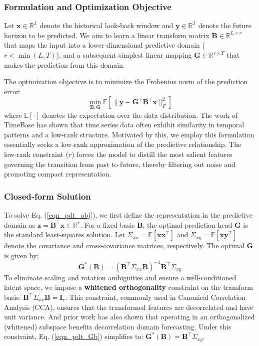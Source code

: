 \documentclass[final,3p,times]{elsarticle}
\begin{document}
\subsubsection{Formulation and Optimization Objective}

Let $\mathbf{x} \in \mathbb{R}^{L}$ denote the historical look-back window and $\mathbf{y} \in \mathbb{R}^{T}$ denote the future horizon to be predicted. We aim to learn a linear transform matrix $\mathbf{B} \in \mathbb{R}^{L\times r}$ that maps the input into a lower-dimensional predictive domain ($r < \min(L,T)$), and a subsequent simplest linear mapping $\mathbf{G} \in \mathbb{R}^{r\times T}$ that makes the prediction from this domain.

The optimization objective is to minimize the Frobenius norm of the prediction error:
\begin{equation}
\label{eqn_pdt_obj}
\min_{\mathbf{B}, \mathbf{G}} \mathbb{E} \left[ \|\mathbf{y} - \mathbf{G}^\top \mathbf{B}^\top \mathbf{x} \|_F^2 \right]
\end{equation}
where $\mathbb{E}[\cdot]$ denotes the expectation over the data distribution. The work of TimeBase\cite{huang2025timebase} has shown that time series data often exhibit similarity in temporal patterns and a low-rank structure. Motivated by this, we employ this formulation essentially seeks a low-rank approximation of the predictive relationship. The low-rank constraint ($r$) forces the model to distill the most salient features governing the transition from past to future, thereby filtering out noise and promoting compact representation.

\subsubsection{Closed-form Solution}

To solve Eq. (\ref{eqn_pdt_obj}), we first define the representation in the predictive domain as $\mathbf{z} = \mathbf{B}^\top \mathbf{x} \in \mathbb{R}^r$. For a fixed basis $\mathbf{B}$, the optimal prediction head $\mathbf{G}$ is the standard least-squares solution. Let $\Sigma_{xx} = \mathbb{E}[\mathbf{x}\mathbf{x}^\top]$ and $\Sigma_{xy} = \mathbb{E}[\mathbf{x}\mathbf{y}^\top]$ denote the covariance and cross-covariance matrices, respectively. The optimal $\mathbf{G}$ is given by:
\begin{equation}
\label{eqn_pdt_Gb}
\mathbf{G}^*(\mathbf{B}) = (\mathbf{B}^\top \Sigma_{xx} \mathbf{B})^{-1} \mathbf{B}^\top \Sigma_{xy}
\end{equation}
To eliminate scaling and rotation ambiguities and ensure a well-conditioned latent space, we impose a \textbf{whitened orthogonality} constraint on the transform basis: $\mathbf{B}^\top \Sigma_{xx} \mathbf{B} = \mathbf{I}_r$. This constraint, commonly used in Canonical Correlation Analysis (CCA), ensures that the transformed features are decorrelated and have unit variance. And prior work\cite{wang2025transdf} has also shown that operating in an orthogonalized (whitened) subspace benefits decorrelation domain forecasting. Under this constraint, Eq. (\ref{eqn_pdt_Gb}) simplifies to: $\mathbf{G}^*(\mathbf{B}) = \mathbf{B}^\top \Sigma_{xy}$.
\end{document}
